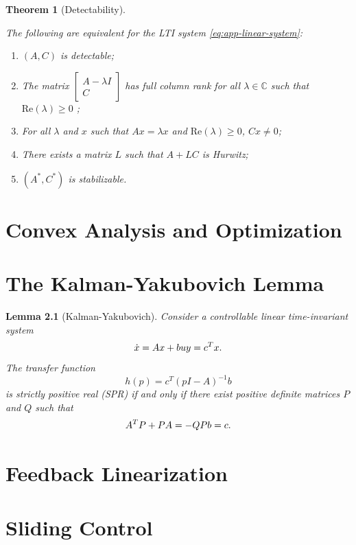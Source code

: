 \documentclass[
]{book}
\newtheorem{theorem}{Theorem}[chapter]
\newtheorem{lemma}{Lemma}[chapter]
\theoremstyle{definition}
\theoremstyle{definition}
\theoremstyle{definition}
\theoremstyle{definition}
\theoremstyle{remark}
\begin{document}
\begin{theorem}[Detectability]
\protect\hypertarget{thm:ltidetectable}{}\label{thm:ltidetectable}

The following are equivalent for the LTI system \eqref{eq:app-linear-system}:

\begin{enumerate}
\def\labelenumi{\arabic{enumi}.}
\item
  \((A,C)\) is detectable;
\item
  The matrix \(\begin{bmatrix} A - \lambda I \\ C \end{bmatrix}\) has full column rank for all \(\lambda \in \mathbb{C}\) such that \(\mathrm{Re}(\lambda) \geq 0\) ;
\item
  For all \(\lambda\) and \(x\) such that \(Ax = \lambda x\) and \(\mathrm{Re}(\lambda) \geq 0\), \(Cx \neq 0\);
\item
  There exists a matrix \(L\) such that \(A + LC\) is Hurwitz;
\item
  \((A^*,C^*)\) is stabilizable.
\end{enumerate}

\end{theorem}

\hypertarget{appconvex}{%
\chapter{Convex Analysis and Optimization}\label{appconvex}}

\hypertarget{the-kalman-yakubovich-lemma}{%
\chapter{The Kalman-Yakubovich Lemma}\label{the-kalman-yakubovich-lemma}}

\begin{lemma}[Kalman-Yakubovich]
\protect\hypertarget{lem:KalmanYakubovich}{}\label{lem:KalmanYakubovich}Consider a controllable linear time-invariant system
\[
\dot{x} = A x + b u \\
y = c^T x.
\]
The transfer function
\[
h(p) = c^T (p I - A)^{-1} b 
\]
is strictly positive real (SPR) if and only if there exist positive definite matrices \(P\) and \(Q\) such that
\[
A^T P + P A = - Q \\
Pb = c.
\]
\end{lemma}

\hypertarget{feedbacklinearization}{%
\chapter{Feedback Linearization}\label{feedbacklinearization}}

\hypertarget{slidingcontrol}{%
\chapter{Sliding Control}\label{slidingcontrol}}

  
\end{document}
